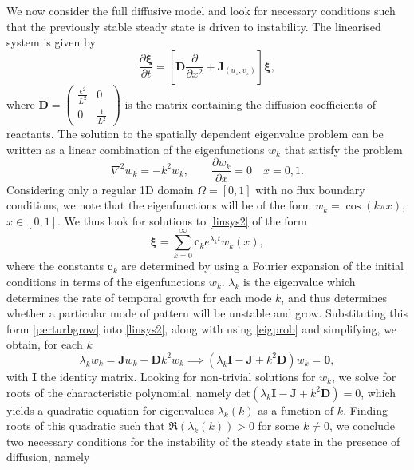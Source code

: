 We now consider the full diffusive model and look for necessary conditions such that the previously stable steady state is driven to instability. The linearised system is given by
\begin{equation}\label{linsys2}
    \frac{\partial \pmb{\xi}}{\partial t}=\left[\textbf{D}\frac{\partial}{\partial x^2}+\textbf{J}_{(u_\star,v_\star)} \right]\pmb{\xi},
\end{equation}
where $\textbf{D}=\begin{pmatrix}\frac{\epsilon^2}{L^2}&0\\0&\frac{1}{L^2}\end{pmatrix}$ is the matrix containing the diffusion coefficients of reactants. The solution to the spatially dependent eigenvalue problem can be written as a linear combination of the eigenfunctions $w_k$ that satisfy the problem
\begin{equation}\label{eigprob}
\nabla^2w_k=-k^2w_k,\quad \quad \frac{\partial w_k}{\partial x}=0\quad x=0, 1.
\end{equation}
Considering only a regular 1D domain $\Omega=[0,1]$ with no flux boundary conditions, we note that the eigenfunctions will be of the form $w_k=\cos(k\pi x)$, $x\in[0,1]$. We thus look for solutions to \eqref{linsys2} of the form
\begin{equation}\label{perturbgrow}
    \pmb{\xi}=\sum_{k=0}^{\infty} \textbf{c}_ke^{\lambda_k t}w_k(x),
\end{equation}
where the constants $\textbf{c}_k$ are determined by using a Fourier expansion of the initial conditions in terms of the eigenfunctions $w_k$. $\lambda_k$ is the eigenvalue which determines the rate of temporal growth for each mode $k$, and thus determines whether a particular mode of pattern will be unstable and grow. Substituting this form \eqref{perturbgrow} into \eqref{linsys2}, along with using \eqref{eigprob} and simplifying, we obtain, for each $k$ 
$$
\lambda_k w_k=\textbf{J}w_k-\textbf{D}k^2w_k \implies (\lambda_k \textbf{I}-\textbf{J}+k^2\textbf{D})w_k=\textbf{0},
$$
with $\textbf{I}$ the identity matrix. Looking for non-trivial solutions for $w_k$, we solve for roots of the characteristic polynomial, namely $\text{det}(\lambda_k \textbf{I}-\textbf{J}+k^2\textbf{D})=0$, which yields a quadratic equation for eigenvalues $\lambda_k(k)$ as a function of $k$. Finding roots of this quadratic such that $\Re(\lambda_k(k))>0$ for some $k\neq0$, we conclude \cite{murray} two necessary conditions for the instability of the steady state in the presence of diffusion, namely
